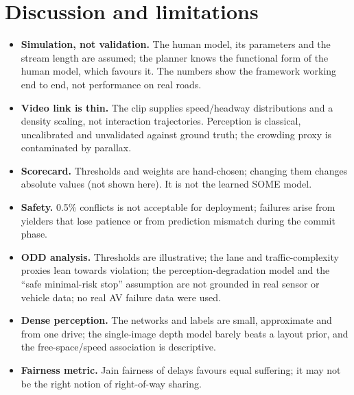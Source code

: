 \documentclass[11pt,a4paper]{article}
\begin{document}
\section{Discussion and limitations}
\begin{itemize}\setlength\itemsep{1pt}
\item \textbf{Simulation, not validation.} The human model, its parameters and the stream length are assumed; the planner knows the functional form of the human model, which favours it. The numbers show the framework working end to end, not performance on real roads.
\item \textbf{Video link is thin.} The clip supplies speed/headway distributions and a density scaling, not interaction trajectories. Perception is classical, uncalibrated and unvalidated against ground truth; the crowding proxy is contaminated by parallax.
\item \textbf{Scorecard.} Thresholds and weights are hand-chosen; changing them changes absolute values (not shown here). It is not the learned SOME model.
\item \textbf{Safety.} 0.5\% conflicts is not acceptable for deployment; failures arise from yielders that lose patience or from prediction mismatch during the commit phase.
\item \textbf{ODD analysis.} Thresholds are illustrative; the lane and traffic-complexity proxies lean towards violation; the perception-degradation model and the ``safe minimal-risk stop'' assumption are not grounded in real sensor or vehicle data; no real AV failure data were used.
\item \textbf{Dense perception.} The networks and labels are small, approximate and from one drive; the single-image depth model barely beats a layout prior, and the free-space/speed association is descriptive.
\item \textbf{Fairness metric.} Jain fairness of delays favours equal suffering; it may not be the right notion of right-of-way sharing.
\end{itemize}
\end{document}
